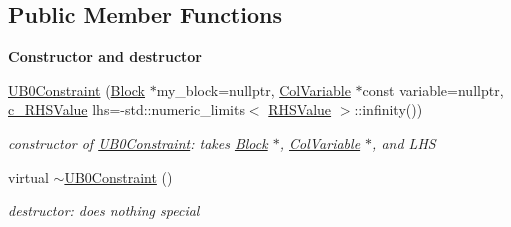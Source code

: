 \subsection*{Public Member Functions}
\begin{Indent}\textbf{ Constructor and destructor}\par
\begin{DoxyCompactItemize}
\item 
\mbox{\hyperlink{class_s_m_spp__di__unipi__it_1_1_u_b0_constraint_ae251cae844f2ccd1c920f3c49d1ed5a0}{U\+B0\+Constraint}} (\mbox{\hyperlink{class_s_m_spp__di__unipi__it_1_1_block}{Block}} $\ast$my\+\_\+block=nullptr, \mbox{\hyperlink{class_s_m_spp__di__unipi__it_1_1_col_variable}{Col\+Variable}} $\ast$const variable=nullptr, \mbox{\hyperlink{class_s_m_spp__di__unipi__it_1_1_row_constraint_a34abd4b01d3a2024be5f6d13dd88779f}{c\+\_\+\+R\+H\+S\+Value}} lhs=-\/std\+::numeric\+\_\+limits$<$ \mbox{\hyperlink{class_s_m_spp__di__unipi__it_1_1_row_constraint_a8813536ab3b13a81c8e83a999ade3bd8}{R\+H\+S\+Value}} $>$\+::infinity())
\begin{DoxyCompactList}\small\item\em constructor of \mbox{\hyperlink{class_s_m_spp__di__unipi__it_1_1_u_b0_constraint}{U\+B0\+Constraint}}\+: takes \mbox{\hyperlink{class_s_m_spp__di__unipi__it_1_1_block}{Block}} $\ast$, \mbox{\hyperlink{class_s_m_spp__di__unipi__it_1_1_col_variable}{Col\+Variable}} $\ast$, and L\+HS \end{DoxyCompactList}\item 
\mbox{\label{class_s_m_spp__di__unipi__it_1_1_u_b0_constraint_ace9832ba40cced81e194c9cb30577005}} 
virtual \mbox{\hyperlink{class_s_m_spp__di__unipi__it_1_1_u_b0_constraint_ace9832ba40cced81e194c9cb30577005}{$\sim$\+U\+B0\+Constraint}} ()
\begin{DoxyCompactList}\small\item\em destructor\+: does nothing special \end{DoxyCompactList}\end{DoxyCompactItemize}
\end{Indent}
